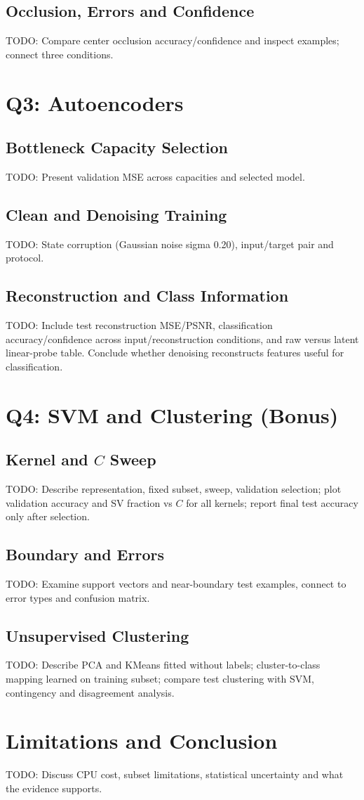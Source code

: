 \documentclass[10pt,twocolumn]{article}
\begin{document}
\subsection{Occlusion, Errors and Confidence}
TODO: Compare center occlusion accuracy/confidence and inspect examples; connect three conditions.
\section{Q3: Autoencoders}
\subsection{Bottleneck Capacity Selection}
TODO: Present validation MSE across capacities and selected model.
\subsection{Clean and Denoising Training}
TODO: State corruption (Gaussian noise sigma 0.20), input/target pair and protocol.
\subsection{Reconstruction and Class Information}
TODO: Include test reconstruction MSE/PSNR, classification accuracy/confidence across input/reconstruction conditions, and raw versus latent linear-probe table. Conclude whether denoising reconstructs features useful for classification.
\section{Q4: SVM and Clustering (Bonus)}
\subsection{Kernel and $C$ Sweep}
TODO: Describe representation, fixed subset, sweep, validation selection; plot validation accuracy and SV fraction vs $C$ for all kernels; report final test accuracy only after selection.
\subsection{Boundary and Errors}
TODO: Examine support vectors and near-boundary test examples, connect to error types and confusion matrix.
\subsection{Unsupervised Clustering}
TODO: Describe PCA and KMeans fitted without labels; cluster-to-class mapping learned on training subset; compare test clustering with SVM, contingency and disagreement analysis.
\section{Limitations and Conclusion}
TODO: Discuss CPU cost, subset limitations, statistical uncertainty and what the evidence supports.
\end{document}
